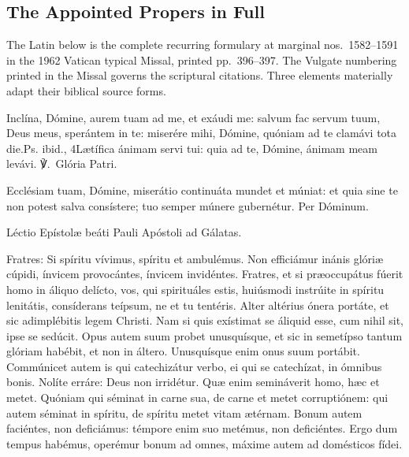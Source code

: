 \subsection*{The Appointed Propers in Full}

\noindent The Latin below is the complete recurring formulary at marginal
nos.~1582--1591 in the 1962 Vatican typical Missal, printed pp.~396--397.
The Vulgate numbering printed in the Missal governs the scriptural citations. Three
elements materially adapt their biblical source forms.

\label{introit}
{Inclína, Dómine, aurem tuam ad me, et exáudi me: salvum fac servum tuum,
Deus meus, sperántem in te: miserére mihi, Dómine, quóniam ad te clamávi
tota die.}{Ps. ibid., 4}{Lætífica ánimam servi tui: quia ad te,
Dómine, ánimam meam levávi. ℣.~Glória Patri.}

\label{collect}
Ecclésiam tuam, Dómine, miserátio continuáta mundet et múniat: et quia sine
te non potest salva consístere; tuo semper múnere gubernétur. Per Dóminum.
\finishfulltextelement

\label{epistle}
Léctio Epístolæ beáti Pauli Apóstoli ad Gálatas.

Fratres: Si spíritu vívimus, spíritu et ambulémus. Non efficiámur inánis
glóriæ cúpidi, ínvicem provocántes, ínvicem invidéntes. Fratres, et si
præoccupátus fúerit homo in áliquo delícto, vos, qui spirituáles estis,
huiúsmodi instrúite in spíritu lenitátis, consíderans teípsum, ne et tu
tentéris. Alter altérius ónera portáte, et sic adimplébitis legem Christi.
Nam si quis exístimat se áliquid esse, cum nihil sit, ipse se sedúcit. Opus
autem suum probet unusquísque, et sic in semetípso tantum glóriam habébit,
et non in áltero. Unusquísque enim onus suum portábit. Commúnicet autem is
qui catechizátur verbo, ei qui se catechízat, in ómnibus bonis. Nolíte
erráre: Deus non irridétur. Quæ enim semináverit homo, hæc et metet. Quóniam
qui séminat in carne sua, de carne et metet corruptiónem: qui autem séminat
in spíritu, de spíritu metet vitam ætérnam. Bonum autem faciéntes, non
deficiámus: témpore enim suo metémus, non deficiéntes. Ergo dum tempus
habémus, operémur bonum ad omnes, máxime autem ad domésticos fídei.
\finishfulltextelement

